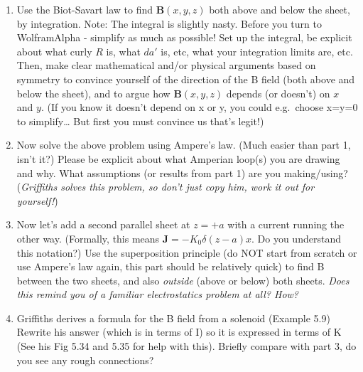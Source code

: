 \documentclass[11pt]{article}
\def\tightlist{}
\begin{document}
\begin{enumerate}
\def\labelenumi{\arabic{enumi}.}
\tightlist
\item
  Use the Biot-Savart law to find \(\mathbf{B}(x,y,z)\) both above and
  below the sheet, by integration. Note: The integral is slightly nasty.
  Before you turn to WolframAlpha - simplify as much as possible! Set up
  the integral, be explicit about what curly \(R\) is, what \(da'\) is,
  etc, what your integration limits are, etc. Then, make clear
  mathematical and/or physical arguments based on symmetry to convince
  yourself of the direction of the B field (both above and below the
  sheet), and to argue how \(\mathbf{B}(x,y,z)\) depends (or doesn't) on
  \(x\) and \(y\). (If you know it doesn't depend on x or y, you could
  e.g.~choose x=y=0 to simplify\ldots{} But first you must convince us
  that's legit!)
\item
  Now solve the above problem using Ampere's law. (Much easier than part
  1, isn't it?) Please be explicit about what Amperian loop(s) you are
  drawing and why. What assumptions (or results from part 1) are you
  making/using? (\emph{Griffiths solves this problem, so don't just copy
  him, work it out for yourself!})
\item
  Now let's add a second parallel sheet at \(z=+a\) with a current
  running the other way. (Formally, this means
  \(\mathbf{J}=-K_0\delta(z-a)\hat{x}\). Do you understand this
  notation?) Use the superposition principle (do NOT start from scratch
  or use Ampere's law again, this part should be relatively quick) to
  find B between the two sheets, and also \emph{outside} (above or
  below) both sheets. \emph{Does this remind you of a familiar
  electrostatics problem at all? How?}
\item
  Griffiths derives a formula for the B field from a solenoid (Example
  5.9) Rewrite his answer (which is in terms of I) so it is expressed in
  terms of K (See his Fig 5.34 and 5.35 for help with this). Briefly
  compare with part 3, do you see any rough connections?
\end{enumerate}
\end{document}
